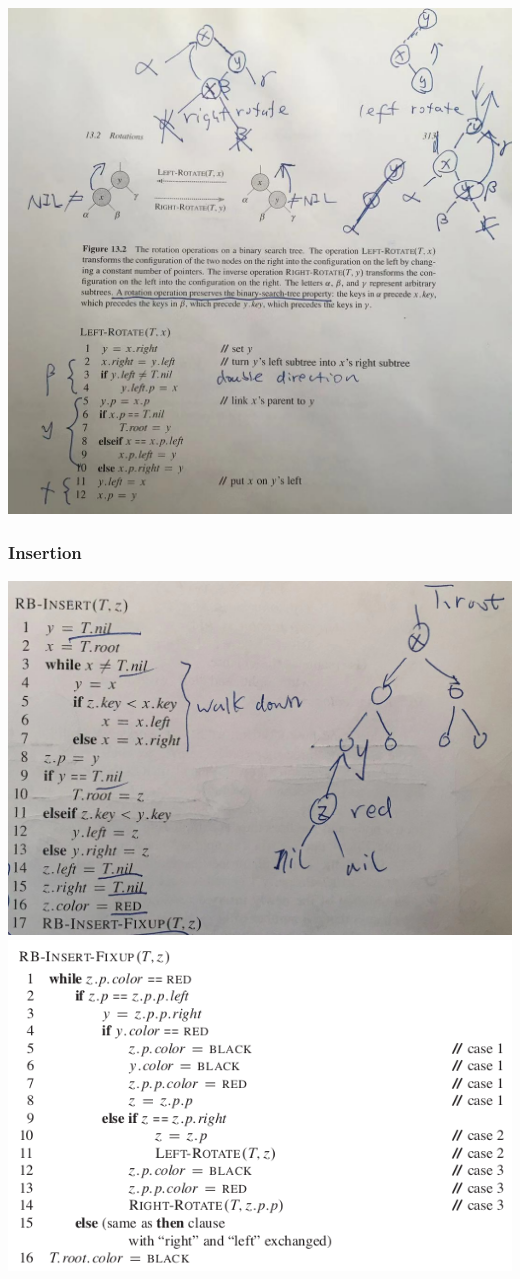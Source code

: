 \documentclass[11pt]{article}
\begin{document}
\includegraphics[width=.9\linewidth]{pics/c13_left_rotate.jpeg} \\


\subsubsection{Insertion}
\label{sec-4-4-3}

\includegraphics[width=.9\linewidth]{pics/c13_insert.png} \\

\includegraphics[width=.9\linewidth]{pics/c13_insert_fixup.png} \\
\end{document}

